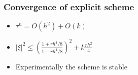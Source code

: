 \documentclass[screen]{beamer}
\begin{document}
\begin{frame}
\frametitle{Convergence of explicit scheme}

\begin{itemize}
\item $\tau ^n = O(h^2) + O(k) $
\item $|\xi |^2 \le \left(\frac{1+rh^4/8}{1-rh^4/8}\right)^2 + k\frac{rh^2}{4}$
\item Experimentally the scheme is stable
\end{itemize}

\end{frame}

\begin{frame}



\end{frame}
\end{document}
